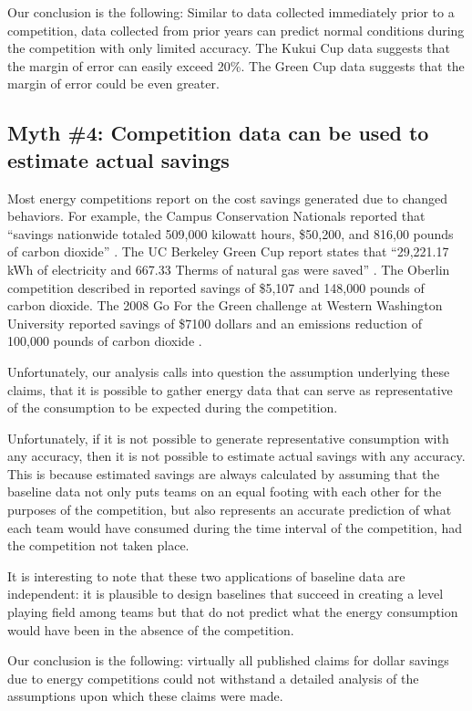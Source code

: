 \documentclass[jou]{apa} %
\begin{document}
Our conclusion is the following: Similar to data collected immediately prior to a
competition, data collected from prior years can predict normal conditions during the
competition with only limited accuracy.  The Kukui Cup data suggests that the margin of error can easily
exceed 20\%.  The Green Cup data suggests that the margin of error could be even greater. 


\subsection{Myth \#4: Competition data can be used to estimate actual savings}

Most energy competitions report on the cost savings generated due to changed behaviors.
For example, the Campus Conservation Nationals reported that ``savings nationwide totaled 509,000
kilowatt hours, \$50,200, and 816,00 pounds of carbon dioxide'' \cite{Willens2010}.  The UC
Berkeley Green Cup report states that ``29,221.17 kWh of electricity and 667.33 Therms of
natural gas were saved'' \cite{Dhong2011}. The Oberlin competition described in \cite{Petersen07a}
reported savings of \$5,107 and 148,000 pounds of carbon dioxide. The 2008 Go For the Green
challenge at Western Washington University reported savings of \$7100 dollars and
an emissions reduction of 100,000 pounds of carbon dioxide \cite{Mauney-thesis}.

Unfortunately, our analysis calls into question the assumption underlying these claims,
that it is possible to gather energy data that can serve as representative of the
consumption to be expected during the competition. 

Unfortunately, if it is not possible to generate representative consumption with any
accuracy, then it is not possible to estimate actual savings with any accuracy.  This is
because estimated savings are always calculated by assuming that the baseline data not
only puts teams on an equal footing with each other for the purposes of the competition,
but also represents an accurate prediction of what each team would have consumed during
the time interval of the competition, had the competition not taken place.  

It is interesting to note that these two applications of baseline data are
independent: it is plausible to design baselines that succeed in creating a
level playing field among teams but that do not predict what the energy
consumption would have been in the absence of the competition.

Our conclusion is the following: virtually all published claims for dollar savings due to
energy competitions could not withstand a detailed analysis of the assumptions upon which
these claims were made.  
\end{document}
